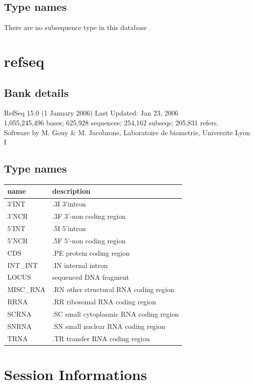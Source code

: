 \documentclass{article}
\begin{document}
\begin{Schunk}
\subsection{Type names}
There are no subsequence type in this database
\section{ refseq }
\subsection{Bank details}
RefSeq 15.0 (1 January 2006) Last Updated: Jan 23, 2006\\
1,055,245,496 bases; 625,928 sequences; 254,162 subseqs; 205,831 refers.\\
Software by M. Gouy \& M. Jacobzone, Laboratoire de biometrie, Universite Lyon I

\subsection{Type names}
\noindent\begin{tabular}{ll}
\hline \hline
name & description\\
\hline
3'INT & .3I 3'intron \\
3'NCR & .3F  3'-non coding region \\
5'INT & .5I 5'intron \\
5'NCR & .5F  5'-non coding region \\
CDS & .PE protein coding region \\
INT\_INT & .IN  internal intron \\
LOCUS & sequenced DNA fragment \\
MISC\_RNA & .RN other structural RNA coding region \\
RRNA & .RR ribosomal RNA coding region \\
SCRNA & .SC small cytoplasmic RNA coding region \\
SNRNA & .SN small nuclear RNA coding region \\
TRNA & .TR transfer RNA coding region \\
\hline \hline
\end{tabular}\end{Schunk}


\section{Session Informations}
\end{document}

